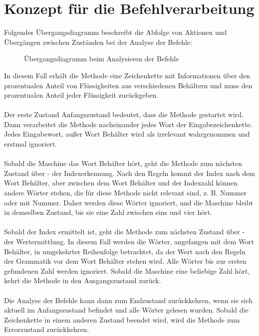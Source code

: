 \section{Konzept für die Befehlverarbeitung}\label{sec:befehlverarbeitung_konzept}
Folgendes Übergangsdiagramm beschreibt die Abfolge von Aktionen und Übergängen zwischen Zuständen bei der Analyse der Befehle:
\begin{figure}[H]
    \centering
    \caption{\label{figure:Uebergangsdiagram_Befehle}Übergangsdiagramm beim Analysieren der Befehle}
\end{figure}
\noindent
In diesem Fall erhält die Methode eine Zeichenkette mit Informationen über den prozentualen Anteil von Flüssigkeiten aus verschiedenen Behältern und muss den prozentualen Anteil jeder Flüssigkeit zurückgeben.\\\\
Der erste Zustand \glqq{}Anfangszustand\grqq{} bedeutet, dass die Methode gestartet wird. Dann verarbeitet die Methode nacheinander jedes Wort der Eingabezeichenkette. 
Jedes Eingabewort, außer Wort \glqq{}Behälter\grqq{} wird als irrelevant wahrgenommen und erstmal ignoriert.\\\\ 
Sobald die Maschine das Wort \glqq{}Behälter\grqq{} hört, geht die Methode zum nächsten Zustand über - der Indexerkennung. 
Nach den Regeln kommt der Index nach dem Wort \glqq{}Behälter\grqq{}, aber zwischen dem Wort \glqq{}Behälter\grqq{} und der Indexzahl können andere Wörter stehen, die für diese Methode nicht relevant sind, z. B. \glqq{}Nummer\grqq{} oder \glqq{}mit Nummer\grqq{}. 
Daher werden diese Wörter ignoriert, und die Maschine bleibt in demselben Zustand, bis sie eine Zahl zwischen eins und vier hört.\\\\
Sobald der Index ermittelt ist, geht die Methode zum nächsten Zustand über - der Wertermittlung. 
In diesem Fall werden die Wörter, angefangen mit dem Wort \glqq{}Behälter\grqq{}, in umgekehrter Reihenfolge betrachtet, da der Wert nach den Regeln der Grammatik vor dem Wort \glqq{}Behälter\grqq{} stehen wird. 
Alle Wörter bis zur ersten gefundenen Zahl werden ignoriert. 
Sobald die Maschine eine beliebige Zahl hört, kehrt die Methode in den Ausgangszustand zurück.\\\\
Die Analyse der Befehle kann dann zum Endzustand zurückkehren, wenn sie sich aktuell im Anfangszustand befindet und alle Wörter gelesen wurden. 
Sobald die Zeichenkette in einem anderen Zustand beendet wird, wird die Methode zum Errorzustand zurückkehren.
\endinput



